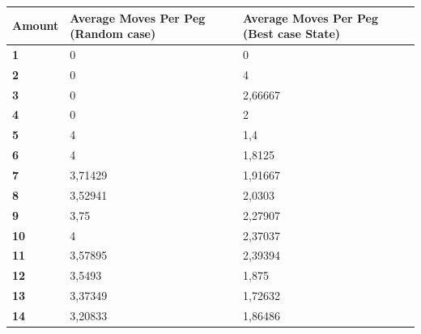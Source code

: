 \documentclass[a4paper]{article}
\begin{document}
\begin{table}[]
\centering
\label{avg-pegs-table}
\begin{tabular}{|l|l|l|}
\hline
\textbf{Amount} & \textbf{Average Moves Per Peg (Random case)} & \textbf{Average Moves Per Peg (Best case State)} \\ \hline
\textbf{1}      & 0                                            & 0                                                \\ \hline
\textbf{2}      & 0                                            & 4                                                \\ \hline
\textbf{3}      & 0                                            & 2,66667                                          \\ \hline
\textbf{4}      & 0                                            & 2                                                \\ \hline
\textbf{5}      & 4                                            & 1,4                                              \\ \hline
\textbf{6}      & 4                                            & 1,8125                                           \\ \hline
\textbf{7}      & 3,71429                                      & 1,91667                                          \\ \hline
\textbf{8}      & 3,52941                                      & 2,0303                                           \\ \hline
\textbf{9}      & 3,75                                         & 2,27907                                          \\ \hline
\textbf{10}     & 4                                            & 2,37037                                          \\ \hline
\textbf{11}     & 3,57895                                      & 2,39394                                          \\ \hline
\textbf{12}     & 3,5493                                       & 1,875                                            \\ \hline
\textbf{13}     & 3,37349                                      & 1,72632                                          \\ \hline
\textbf{14}     & 3,20833                                      & 1,86486                                          \\ \hline

\end{tabular}
\end{table}
\end{document}
